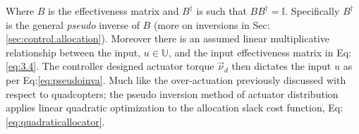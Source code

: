 Where $B$ is the effectiveness matrix and $B^{\dagger}$ is such that $BB^{\dagger}=\mathbb{I}$. Specifically $B^{\dagger}$ is the general \emph{pseudo} inverse of $B$ (more on inversions in Sec:\ref{sec:control.allocation}). Moreover there is an assumed linear multiplicative relationship between the input, $u\in\mathbb{U}$, and the input effectiveness matrix in Eq:\ref{eq:3.4}. The controller designed actuator torque $\vec{\nu}_d$ then dictates the input $u$ as per Eq:\ref{eq:pseudoinva}. Much like the over-actuation previously discussed with respect to quadcopters; the pseudo inversion method of actuator distribution applies linear quadratic optimization to the allocation slack cost function, Eq:\ref{eq:quadraticallocator}. 